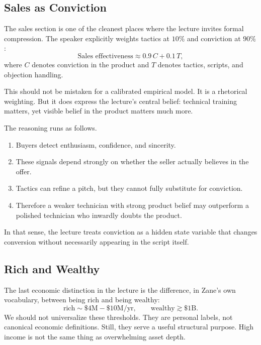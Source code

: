 \subsection{Sales as Conviction}

The sales section is one of the cleanest places where the lecture invites formal compression. The speaker explicitly weights tactics at \(10\%\) and conviction at \(90\%\):
\begin{equation}
\text{Sales effectiveness} \approx 0.9\,C + 0.1\,T,
\end{equation}
where \(C\) denotes conviction in the product and \(T\) denotes tactics, scripts, and objection handling.

This should not be mistaken for a calibrated empirical model. It is a rhetorical weighting. But it does express the lecture's central belief: technical training matters, yet visible belief in the product matters much more.

The reasoning runs as follows.
\begin{enumerate}
\item Buyers detect enthusiasm, confidence, and sincerity.
\item These signals depend strongly on whether the seller actually believes in the offer.
\item Tactics can refine a pitch, but they cannot fully substitute for conviction.
\item Therefore a weaker technician with strong product belief may outperform a polished technician who inwardly doubts the product.
\end{enumerate}

In that sense, the lecture treats conviction as a hidden state variable that changes conversion without necessarily appearing in the script itself.

\subsection{Rich and Wealthy}

The last economic distinction in the lecture is the difference, in Zane's own vocabulary, between being rich and being wealthy:
\begin{equation}
\text{rich}\sim \$4\text{M}-\$10\text{M}/\text{yr},\qquad \text{wealthy}\gtrsim \$1\text{B}.
\end{equation}
We should not universalize these thresholds. They are personal labels, not canonical economic definitions. Still, they serve a useful structural purpose. High income is not the same thing as overwhelming asset depth.

